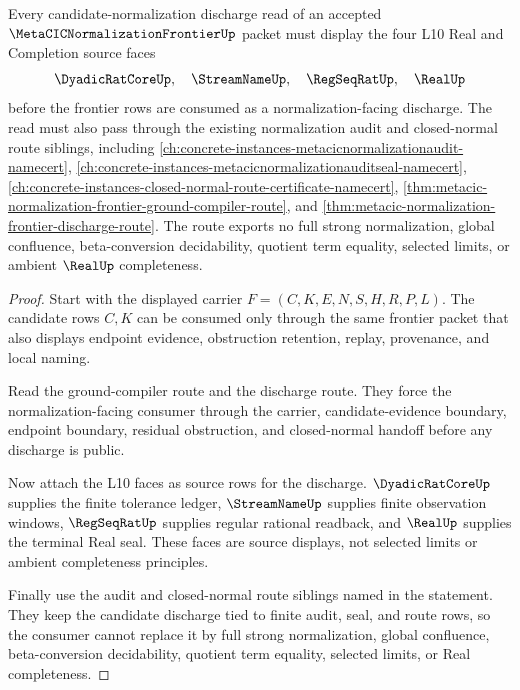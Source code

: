 \begin{theorem}
\label{thm:metacic-normalization-frontier-l10-candidate-discharge-route}
Every candidate-normalization discharge read of an accepted $\MetaCICNormalizationFrontierUp$ packet must display the four L10 Real and Completion source faces
$$
\DyadicRatCoreUp,\quad \StreamNameUp,\quad \RegSeqRatUp,\quad \RealUp
$$
before the frontier rows are consumed as a normalization-facing discharge. The read must also pass through the existing normalization audit and closed-normal route siblings, including \autoref{ch:concrete-instances-metacicnormalizationaudit-namecert}, \autoref{ch:concrete-instances-metacicnormalizationauditseal-namecert}, \autoref{ch:concrete-instances-closed-normal-route-certificate-namecert}, \autoref{thm:metacic-normalization-frontier-ground-compiler-route}, and \autoref{thm:metacic-normalization-frontier-discharge-route}. The route exports no full strong normalization, global confluence, beta-conversion decidability, quotient term equality, selected limits, or ambient $\RealUp$ completeness.
\end{theorem}
\begin{proof}
Start with the displayed carrier $F=(C,K,E,N,S,H,R,P,L)$. The candidate rows $C,K$ can be consumed only through the same frontier packet that also displays endpoint evidence, obstruction retention, replay, provenance, and local naming.

Read the ground-compiler route and the discharge route. They force the normalization-facing consumer through the carrier, candidate-evidence boundary, endpoint boundary, residual obstruction, and closed-normal handoff before any discharge is public.

Now attach the L10 faces as source rows for the discharge. $\DyadicRatCoreUp$ supplies the finite tolerance ledger, $\StreamNameUp$ supplies finite observation windows, $\RegSeqRatUp$ supplies regular rational readback, and $\RealUp$ supplies the terminal Real seal. These faces are source displays, not selected limits or ambient completeness principles.

Finally use the audit and closed-normal route siblings named in the statement. They keep the candidate discharge tied to finite audit, seal, and route rows, so the consumer cannot replace it by full strong normalization, global confluence, beta-conversion decidability, quotient term equality, selected limits, or Real completeness.
\end{proof}

